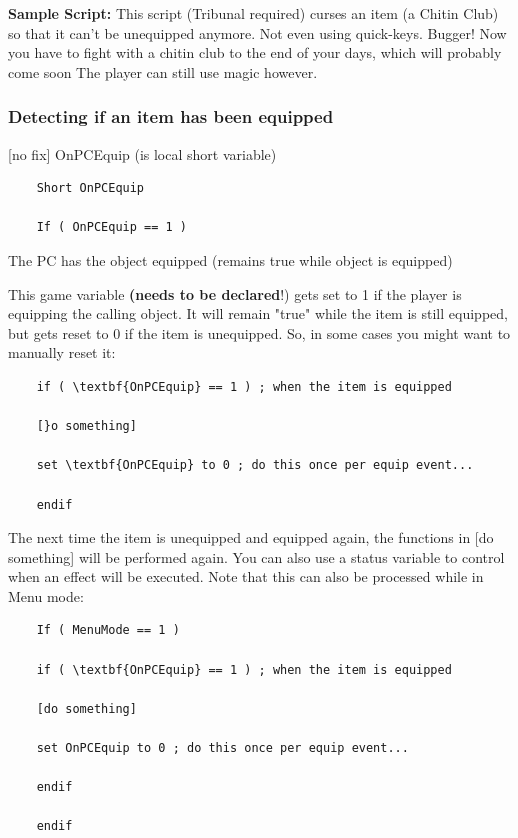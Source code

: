 \textbf{Sample Script:} This script (Tribunal required) curses an item
(a Chitin Club) so that it can't be unequipped anymore. Not even using
quick-keys. Bugger! Now you have to fight with a chitin club to the end
of your days, which will probably come soon The player can still use
magic however.



\hypertarget{detecting-if-an-item-has-been-equipped}{%
\subsubsection{Detecting if an item has been
equipped}\label{detecting-if-an-item-has-been-equipped}}

{[}no fix{]} OnPCEquip (is local short variable)

\begin{lstlisting}
	Short OnPCEquip
	
	If ( OnPCEquip == 1 )
\end{lstlisting}

The PC has the object equipped (remains true while object is equipped)

This game variable \textbf{(needs to be declared}!) gets set to 1 if the
player is equipping the calling object. It will remain "true" while the
item is still equipped, but gets reset to 0 if the item is unequipped.
So, in some cases you might want to manually reset it:

\begin{lstlisting}
	if ( \textbf{OnPCEquip} == 1 ) ; when the item is equipped
	
	[}o something]
	
	set \textbf{OnPCEquip} to 0 ; do this once per equip event...
	
	endif
\end{lstlisting}

The next time the item is unequipped and equipped again, the functions
in {[}do something{]} will be performed again. You can also use a status
variable to control when an effect will be executed. Note that this can
also be processed while in Menu mode:

\begin{lstlisting}
	If ( MenuMode == 1 )
	
	if ( \textbf{OnPCEquip} == 1 ) ; when the item is equipped
	
	[do something]
	
	set OnPCEquip to 0 ; do this once per equip event...
	
	endif
	
	endif
\end{lstlisting}

